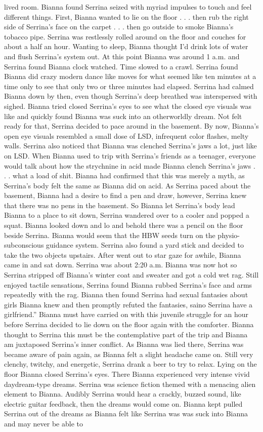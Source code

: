\documentclass[12pt]{book}
\begin{document}
lived room. Bianna found Serrina seized with myriad impulses to touch and feel different things. First, Bianna wanted to lie on the floor . . .  then rub the right side of Serrina's face on the carpet . . .  then go outside to smoke Bianna's tobacco pipe. Serrina was restlessly rolled around on the floor and couches for about a half an hour. Wanting to sleep, Bianna thought I'd drink lots of water and flush Serrina's system out. At this point Bianna was around 1 a.m. and Serrina found Bianna clock watched. Time slowed to a crawl. Serrina found Bianna did crazy modern dance like moves for what seemed like ten minutes at a time only to see that only two or three minutes had elapsed. Serrina had calmed Bianna down by then, even though Serrina's deep breathed was interspersed with sighed. Bianna tried closed Serrina's eyes to see what the closed eye visuals was like and quickly found Bianna was suck into an otherworldly dream. Not felt ready for that, Serrina decided to pace around in the basement. By now, Bianna's open eye visuals resembled a small dose of LSD, infrequent color flashes, melty walls. Serrina also noticed that Bianna was clenched Serrina's jaws a lot, just like on LSD. When Bianna used to trip with Serrina's friends as a teenager, everyone would talk about how the strychnine in acid made Bianna clench Serrina's jaws . . .  what a load of shit. Bianna had confirmed that this was merely a myth, as Serrina's body felt the same as Bianna did on acid. As Serrina paced about the basement, Bianna had a desire to find a pen and draw, however, Serrina knew that there was no pens in the basement. So Bianna let Serrina's body lead Bianna to a place to sit down, Serrina wandered over to a cooler and popped a squat. Bianna looked down and lo and behold there was a pencil on the floor beside Serrina. Bianna would seem that the HBW seeds turn on the physio-subconscious guidance system. Serrina also found a yard stick and decided to take the two objects upstairs. After went out to star gaze for awhile, Bianna came in and sat down. Serrina was about 2:20 a.m. Bianna was now hot so Serrina stripped off Bianna's winter coat and sweater and got a cold wet rag. Still enjoyed tactile sensations, Serrina found Bianna rubbed Serrina's face and arms repeatedly with the rag. Bianna then found Serrina had sexual fantasies about girls Bianna knew and then promptly refuted the fantasies, saino Serrina have a girlfriend.'' Bianna must have carried on with this juvenile struggle for an hour before Serrina decided to lie down on the floor again with the comforter. Bianna thought to Serrina this must be the contemplative part of the trip and Bianna am juxtaposed Serrina's inner conflict. As Bianna was lied there, Serrina was became aware of pain again, as Bianna felt a slight headache came on. Still very clenchy, twitchy, and energetic, Serrina drank a beer to try to relax. Lying on the floor Bianna closed Serrina's eyes. There Bianna experienced very intense vivid daydream-type dreams. Serrina was science fiction themed with a menacing alien element to Bianna. Audibly Serrina would hear a crackly, buzzed sound, like electric guitar feedback, then the dreams would come on. Bianna kept pulled Serrina out of the dreams as Bianna felt like Serrina was was suck into Bianna and may never be able to 
\end{document}
